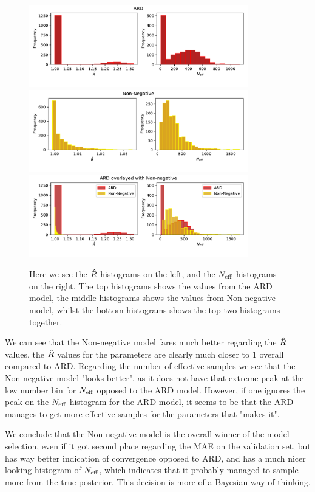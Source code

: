 \documentclass[12pt]{article}
\begin{document}
    \begin{figure}[H]
        \centering
        \caption{Here we see the $\hat{R}$ histograms on the left, and the $N_{\text{eff}}$ histograms on the right. The top histograms shows the values from the ARD model, the middle histograms shows the values from Non-negative model, whilst the bottom histograms shows the top two histograms together.}
        \includegraphics[width=0.85\textwidth]{ARD_hists.pdf}
        \includegraphics[width=0.85\textwidth]{NMF_hists.pdf}
        \includegraphics[width=0.85\textwidth]{ARDNMF_hists.pdf}
    \end{figure}

    We can see that the Non-negative model fares much better regarding the $\hat{R}$ values, the $\hat{R}$ values for the parameters are clearly much closer to $1$ overall compared to ARD. Regarding the number of effective samples we see that the Non-negative model "looks better", as it does not have that extreme peak at the low number bin for $N_{\text{eff}}$ opposed to the ARD model. However, if one ignores the peak on the $N_{\text{eff}}$ histogram for the ARD model, it seems to be that the ARD manages to get more effective samples for the parameters that "makes it". 

    We conclude that the Non-negative model is the overall winner of the model selection, even if it got second place regarding the MAE on the validation set, but has way better indication of convergence opposed to ARD, and has a much nicer looking histogram of $N_{\text{eff}}$, which indicates that it probably managed to sample more from the true posterior. This decision is more of a Bayesian way of thinking. 
\end{document}
